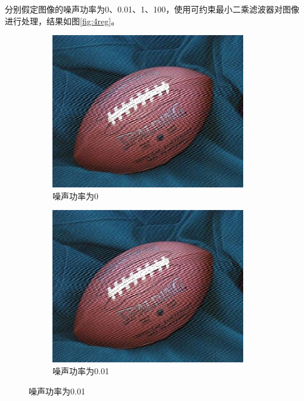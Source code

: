 \documentclass[a4paper]{ctexart}
\newcommand{\outwfour}{0.23\textwidth}
\begin{document}
\begin{spacing}{1.35}
	分别假定图像的噪声功率为0、0.01、1、100，使用可约束最小二乘滤波器对图像进行处理，结果如图\ref{fig:4reg}。
	\begin{figure}[htbp]
		\centering
		\begin{subfigure}[t]{\outwfour}
			\centering
			\includegraphics[width=\textwidth]{figure/deconvreg1.png}
			\caption{噪声功率为0}
		\end{subfigure}
		\begin{subfigure}[t]{\outwfour}
			\centering
			\includegraphics[width=\textwidth]{figure/deconvreg2.png}
			\caption{噪声功率为0.01}
		\end{subfigure}

\end{figure}
\end{spacing}
\end{document}
